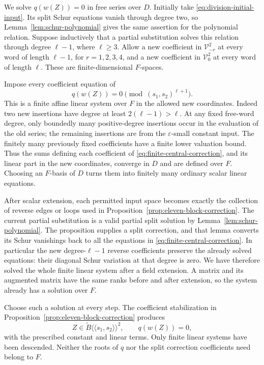 We solve $q(w(Z))=0$ in free series over $D$.  Initially take
\eqref{eq:division-initial-input}.  Its split Schur equations vanish
through degree two, so Lemma~\ref{lem:schur-polynomial} gives the same
assertion for the polynomial relation.  Suppose inductively that a
partial substitution solves this relation through degree $\ell-1$,
where $\ell\ge3$.  Allow a new coefficient in
$\mathcal V_{-r}^2$ at every word of length $\ell-1$, for
$r=1,2,3,4$, and a new coefficient in $\mathcal V_0^2$ at every word
of length $\ell$.  These are finite-dimensional $F$-spaces.

Impose every coefficient equation of
\begin{equation}
 q(w(Z))=0\pmod{(s_1,s_2)^{\ell+1}}.
 \label{eq:finite-central-correction}
\end{equation}
This is a finite affine linear system over $F$ in the allowed new
coordinates.  Indeed two new insertions have degree at least
$2(\ell-1)>\ell$.  At any fixed free-word degree, only boundedly
many positive-degree insertions occur in the evaluation of the old
series; the remaining insertions are from the $\varepsilon$-small
constant input.  The finitely many previously fixed coefficients have
a finite lower valuation bound.  Thus the sums defining each
coefficient of \eqref{eq:finite-central-correction}, and its linear
part in the new coordinates, converge in $D$ and are defined over $F$.
Choosing an $F$-basis of $D$ turns them into finitely many ordinary
scalar linear equations.

After scalar extension, each permitted input space becomes exactly
the collection of reverse edges or loops used in
Proposition~\ref{prop:eleven-block-correction}.  The current partial
substitution is a valid partial split solution by
Lemma~\ref{lem:schur-polynomial}.  The proposition supplies a split
correction, and that lemma converts its Schur vanishings back to all
the equations in \eqref{eq:finite-central-correction}.  In particular
the new degree-$\ell-1$ reverse coefficients preserve the already
solved equations: their diagonal Schur variation at that degree is
zero.  We have therefore solved the whole finite linear system after
a field extension.  A matrix and its augmented matrix have the same
ranks before and after extension, so the system already has a solution
over $F$.

Choose such a solution at every step.  The coefficient stabilization
in Proposition~\ref{prop:eleven-block-correction} produces
\[
 Z\in\widetilde B\langle\!\langle s_1,s_2\rangle\!\rangle^2,
 \qquad q(w(Z))=0,
\]
with the prescribed constant and linear terms.  Only finite linear
systems have been descended.  Neither the roots of $q$ nor the split
correction coefficients need belong to $F$.

